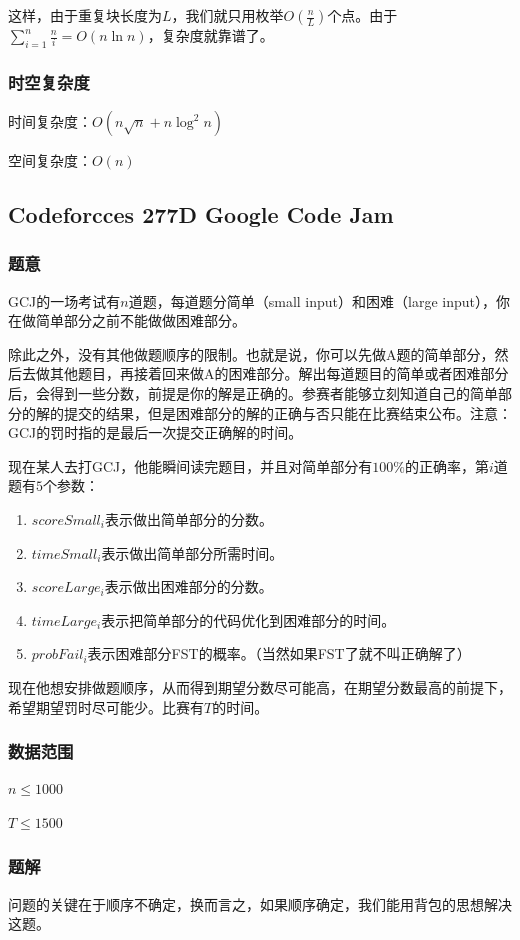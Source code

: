 \documentclass{ctexart}
\begin{document}
这样，由于重复块长度为$L$，我们就只用枚举$O(\frac{n}{L})$个点。由于$\sum\limits_{i=1}^n \frac{n}{i}=O(n \ln n)$，复杂度就靠谱了。
\subsubsection{时空复杂度}
时间复杂度：$O(n\sqrt{n}+n\log^2 n)$

空间复杂度：$O(n)$
\subsection{Codeforcces 277D Google Code Jam}
\subsubsection{题意}
GCJ的一场考试有$n$道题，每道题分简单（small input）和困难（large input），你在做简单部分之前不能做做困难部分。

除此之外，没有其他做题顺序的限制。也就是说，你可以先做A题的简单部分，然后去做其他题目，再接着回来做A的困难部分。解出每道题目的简单或者困难部分后，会得到一些分数，前提是你的解是正确的。参赛者能够立刻知道自己的简单部分的解的提交的结果，但是困难部分的解的正确与否只能在比赛结束公布。注意：GCJ的罚时指的是最后一次提交正确解的时间。

现在某人去打GCJ，他能瞬间读完题目，并且对简单部分有$100\%$的正确率，第$i$道题有$5$个参数：

\begin{enumerate}
\item $scoreSmall_i$表示做出简单部分的分数。
\item $timeSmall_i$表示做出简单部分所需时间。
\item $scoreLarge_i$表示做出困难部分的分数。
\item $timeLarge_i$表示把简单部分的代码优化到困难部分的时间。
\item $probFail_i$表示困难部分FST的概率。（当然如果FST了就不叫正确解了）
\end{enumerate}

现在他想安排做题顺序，从而得到期望分数尽可能高，在期望分数最高的前提下，希望期望罚时尽可能少。比赛有$T$的时间。
\subsubsection{数据范围}
$n \le 1000$

$T \le 1500$
\subsubsection{题解}
问题的关键在于顺序不确定，换而言之，如果顺序确定，我们能用背包的思想解决这题。
\end{document}
